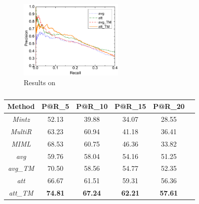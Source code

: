 \begin{figure}[t!]
\setlength{\abovecaptionskip}{3pt}
\includegraphics[width=0.45\textwidth]{figures/re_att_avg_cmp_exp.pdf}
\caption{Results on \EntityRE}
\label{fig: Riedel_res}
\end{figure}



\begin{table}
\centering
\small{
\begin{tabular}{|c|c|c|c|c|c|}
\hline
\textbf{Method}							& \textbf{P@R\_5} 		& \textbf{P@R\_10} 			& \textbf{P@R\_15} & \textbf{P@R\_20} \\
\hline
\textit{Mintz} 							&52.13	&39.88	&34.07	&28.55 	\\
\hline
\textit{MultiR} 						&63.23	&60.94	&41.18	&36.41 	\\
\hline
\textit{MIML} 							&68.53	&60.75	&46.36	&33.82 	\\
\hline
\textit{avg} 								&59.76	&58.04	&54.16	&51.25 	\\
\hline
\textit{avg\_TM} 						&70.50	&58.56	&54.77	&52.35 	\\
\hline
\textit{att} 								&66.67	&61.51	&59.31	&56.36 	\\
\hline
\textit{att\_TM} 						&\textbf{74.81}	&\textbf{67.24}	&\textbf{62.21}	&\textbf{57.61} 	\\
\hline
\end{tabular}
}
\caption{}
\label{feature-based}
\end{table}

